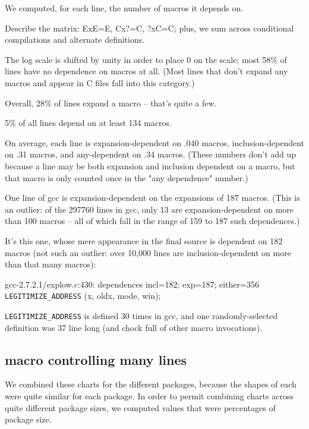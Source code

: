 \documentclass[10pt]{article}
\begin{document}
    We computed, for each line, the number of macros it depends on.

    Describe the matrix:  ExE=E, Cx?=C, ?xC=C; plus, we sum across
      conditional compilations and alternate definitions.

    The log scale is shifted by unity in order to place 0 on the scale; most
      58\% of lines have no dependence on macros at all.  (Most lines that
      don't expand any macros and appear in C files fall into this category.)

    Overall, 28\% of lines expand a macro -- that's quite a few.

    5\% of all lines depend on at least 134 macros.

    On average, each line is expansion-dependent on .040 macros,
      inclusion-dependent on .31 macros, and any-dependent on .34 macros.
      (These numbers don't add up because a line may be both expansion and
      inclusion dependent on a macro, but that macro is only counted once
      in the "any dependence" number.)

        One line of gcc is expansion-dependent on the
        expansions of 187 macros.  (This is an outlier:  of the 297760 lines in
        gcc, only 13 are expansion-dependent on more than 100 macros -- all of
        which fall in the range of 159 to 187 such dependences.)

        It's this one, whose mere appearance in the final source is
        dependent on 182 macros (not such an outlier: over 10,000 lines are
        inclusion-dependent on more than that many macros):

        gcc-2.7.2.1/explow.c:430: dependences incl=182; exp=187; either=356
              \verb|LEGITIMIZE_ADDRESS| (x, oldx, mode, win);

        \verb|LEGITIMIZE_ADDRESS| is defined 30 times in gcc, and one randomly-selected
        definition was 37 line long (and chock full of other macro invocations).

\subsection{macro controlling many lines}

    We combined these charts for the different packages, because the shapes
      of each were quite similar for each package.  In order to permit
      combining charts across quite different package sizes, we computed
      values that were percentages of package size.
\end{document}
